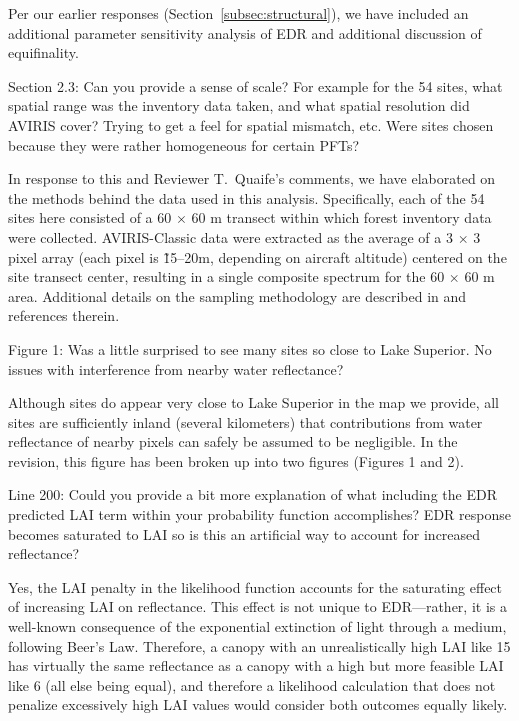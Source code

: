 Per our earlier responses (Section~\ref{subsec:structural}), we have included an additional parameter sensitivity analysis of EDR and additional discussion of equifinality.

\begin{reviewer}
  Section 2.3: Can you provide a sense of scale? For example for the 54 sites, what spatial range was the inventory data taken, and what spatial resolution did AVIRIS cover? Trying to get a feel for spatial mismatch, etc. Were sites chosen because they were rather homogeneous for certain PFTs?
\end{reviewer}

In response to this and Reviewer T.\ Quaife’s comments, we have elaborated on the methods behind the data used in this analysis.
Specifically, each of the 54 sites here consisted of a 60 $\times$ 60 m transect within which forest inventory data were collected.
AVIRIS-Classic data were extracted as the average of a 3 $\times$ 3 pixel array (each pixel is \~15--20m, depending on aircraft altitude) centered on the site transect center, resulting in a single composite spectrum for the 60 $\times$ 60 m area.
Additional details on the sampling methodology are described in \citet{singh2015imaging} and references therein.

\begin{reviewer}
  Figure 1: Was a little surprised to see many sites so close to Lake Superior. No issues with interference from nearby water reflectance?
\end{reviewer}

Although sites do appear very close to Lake Superior in the map we provide, all sites are sufficiently inland (several kilometers) that contributions from water reflectance of nearby pixels can safely be assumed to be negligible.
In the revision, this figure has been broken up into two figures (Figures 1 and 2).

\begin{reviewer}
  Line 200: Could you provide a bit more explanation of what including the EDR predicted LAI term within your probability function accomplishes? EDR response becomes saturated to LAI so is this an artificial way to account for increased reflectance?
\end{reviewer}

Yes, the LAI penalty in the likelihood function accounts for the saturating effect of increasing LAI on reflectance.
This effect is not unique to EDR---rather, it is a well-known consequence of the exponential extinction of light through a medium, following Beer’s Law.
Therefore, a canopy with an unrealistically high LAI like 15 has virtually the same reflectance as a canopy with a high but more feasible LAI like 6 (all else being equal),
and therefore a likelihood calculation that does not penalize excessively high LAI values would consider both outcomes equally likely.

